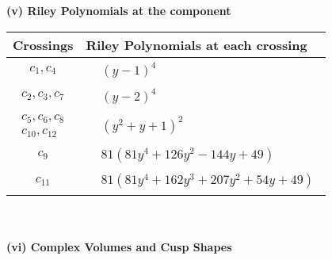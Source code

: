 \documentclass[1p]{elsarticle_modified}
\theoremstyle{definition}
\begin{document}
\newpage\renewcommand{\arraystretch}{1}
\flushleft \textbf{(v) Riley Polynomials at the component}\newline \\
\begin{tabular}{m{50pt}|m{274pt}}
Crossings & \hspace{64pt}Riley Polynomials at each crossing \\
\hline $$\begin{aligned}c_{1},c_{4}\end{aligned}$$&$\begin{aligned}
&(y-1)^4
\end{aligned}$\\
\hline $$\begin{aligned}c_{2},c_{3},c_{7}\end{aligned}$$&$\begin{aligned}
&(y-2)^4
\end{aligned}$\\
\hline $$\begin{aligned}c_{5},c_{6},c_{8}\\c_{10},c_{12}\end{aligned}$$&$\begin{aligned}
&(y^2+y+1)^2
\end{aligned}$\\
\hline $$\begin{aligned}c_{9}\end{aligned}$$&$\begin{aligned}
&81(81 y^4+126 y^2-144 y+49)
\end{aligned}$\\
\hline $$\begin{aligned}c_{11}\end{aligned}$$&$\begin{aligned}
&81(81 y^4+162 y^3+207 y^2+54 y+49)
\end{aligned}$\\
\hline
\end{tabular}\\~\\
\newpage\flushleft \textbf{(vi) Complex Volumes and Cusp Shapes}
\end{document}
